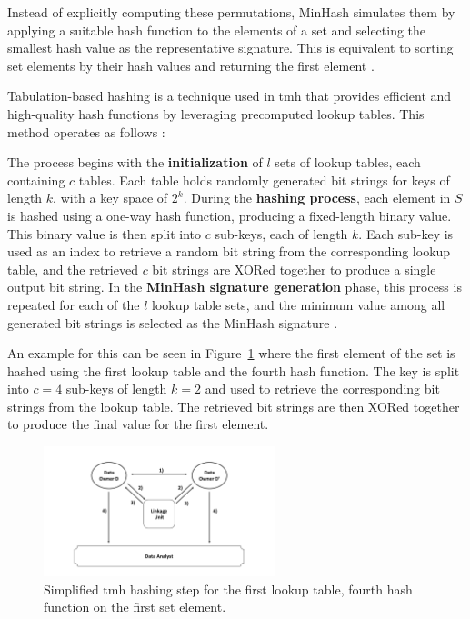 Instead of explicitly computing these permutations, MinHash simulates them by applying a suitable hash function to the elements of a set and selecting the smallest hash value as the representative signature.
This is equivalent to sorting set elements by their hash values and returning the first element \cite{schaefer2024}.

Tabulation-based hashing is a technique used in \ac{tmh} that provides efficient and high-quality hash functions by leveraging precomputed lookup tables.
This method operates as follows \cite{vidanage2020graph}:

The process begins with the \textbf{initialization} of \(l\) sets of lookup tables, each containing \(c\) tables.
Each table holds randomly generated bit strings for keys of length \(k\), with a key space of \(2^k\).
During the \textbf{hashing process}, each element in \(S\) is hashed using a one-way hash function, producing a fixed-length binary value.
This binary value is then split into \(c\) sub-keys, each of length \(k\).
Each sub-key is used as an index to retrieve a random bit string from the corresponding lookup table, and the retrieved \(c\) bit strings are XORed together to produce a single output bit string.
In the \textbf{MinHash signature generation} phase, this process is repeated for each of the \(l\) lookup table sets, and the minimum value among all generated bit strings is selected as the MinHash signature \cite{schaefer2024,vidanage2020graph}.

An example for this can be seen in Figure~\ref{fig:tabminhashexample} where the first element of the set is hashed using the first lookup table and the fourth hash function.
The key is split into \(c = 4\) sub-keys of length \(k = 2\) and used to retrieve the corresponding bit strings from the lookup table.
The retrieved bit strings are then XORed together to produce the final value for the first element.

\begin{figure}[H]
  \centering
  \includegraphics[width=0.6\textwidth, page=7]{img/visualization.pdf}
  \caption{Simplified \ac{tmh} hashing step for the first lookup table, fourth hash function on the first set element.}
  \label{fig:tabminhashexample}
\end{figure}


